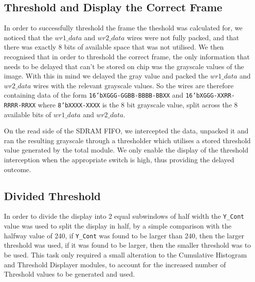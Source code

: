 \documentclass[12pt]{article}
\begin{document}
  \subsection{Threshold and Display the Correct Frame}
  In order to successfully threshold the frame the theshold was calculated for, we noticed that the \(wr1\_data\) and \(wr2\_data\) wires were not fully packed, and that there was exactly 8 bits of available space that was not utilised. We then recognised that in order to threshold the correct frame, the only information that needs to be delayed that can't be stored on chip was the grayscale values of the image. With this in mind we delayed the gray value and packed the \(wr1\_data\) and \(wr2\_data\) wires with the relevant grayscale values. So the wires are therefore containing data of the form \texttt{16'bXGGG-GGBB-BBBB-BBXX} and \texttt{16'bXGGG-XXRR-RRRR-RRXX} where \texttt{8'bXXXX-XXXX} is the 8 bit grayscale value, split across the 8 available bits of \(wr1\_data\) and \(wr2\_data\).

  On the read side of the SDRAM FIFO, we intercepted the data, unpacked it and ran the resulting grayscale through a thresholder which utilises a stored threshold value generated by the total module. We only enable the display of the threshold interception when the appropriate switch is high, thus providing the delayed outcome.

  \subsection{Divided Threshold}
  In order to divide the display into 2 equal subwindows of half width the \texttt{Y\_Cont} value was used to split the display in half, by a simple comparison with the halfway value of 240, if \texttt{Y\_Cont} was found to be larger than 240, then the larger threshold was used, if it was found to be larger, then the smaller threshold was to be used. This task only required a small alteration to the Cumulative Histogram and Threshold Displayer modules, to account for the increased number of Threshold values to be generated and used.
\end{document}
